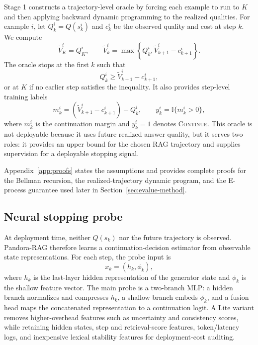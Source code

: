 \documentclass{article}
\newcommand{\method}{Pandora-RAG}
\begin{document}
Stage 1 constructs a trajectory-level oracle by forcing each example to run to $K$ and then applying backward dynamic programming to the realized qualities. For example $i$, let $Q_k^i=Q(s_k^i)$ and $c_k^i$ be the observed quality and cost at step $k$. We compute
\begin{equation}
  \widetilde V_K^i=Q_K^i,\qquad
  \widetilde V_k^i=\max\left\{Q_k^i,\widetilde V_{k+1}^i-c_{k+1}^i\right\}.
  \label{eq:trajectory-dp}
\end{equation}
The oracle stops at the first $k$ such that
\[
  Q_k^i \ge \widetilde V_{k+1}^i-c_{k+1}^i,
\]
or at $K$ if no earlier step satisfies the inequality. It also provides step-level training labels
\begin{equation}
  m_k^i=(\widetilde V_{k+1}^i-c_{k+1}^i)-Q_k^i,
  \qquad
  y_k^i=\mathbb{I}\{m_k^i>0\},
  \label{eq:oracle-labels}
\end{equation}
where $m_k^i$ is the continuation margin and $y_k^i=1$ denotes \textsc{Continue}. This oracle is not deployable because it uses future realized answer quality, but it serves two roles: it provides an upper bound for the chosen RAG trajectory and supplies supervision for a deployable stopping signal.

Appendix~\ref{app:proofs} states the assumptions and provides complete proofs for the Bellman recursion, the realized-trajectory dynamic program, and the E-process guarantee used later in Section~\ref{sec:evalue-method}.

\subsection{Neural stopping probe}
\label{sec:probe}

At deployment time, neither $Q(s_k)$ nor the future trajectory is observed. \method{} therefore learns a continuation-decision estimator from observable state representations. For each step, the probe input is
\[
  x_k=(h_k,\phi_k),
\]
where $h_k$ is the last-layer hidden representation of the generator state and $\phi_k$ is the shallow feature vector. The main probe is a two-branch MLP: a hidden branch normalizes and compresses $h_k$, a shallow branch embeds $\phi_k$, and a fusion head maps the concatenated representation to a continuation logit. A Lite variant removes higher-overhead features such as uncertainty and consistency scores, while retaining hidden states, step and retrieval-score features, token/latency logs, and inexpensive lexical stability features for deployment-cost auditing.
\end{document}
